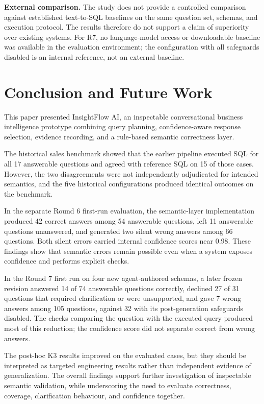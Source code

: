 \documentclass[conference]{IEEEtran}
\begin{document}
\textbf{External comparison.} The study does not provide a controlled comparison against established text-to-SQL baselines on the same question set, schemas, and execution protocol. The results therefore do not support a claim of superiority over existing systems. For R7, no language-model access or downloadable baseline was available in the evaluation environment; the configuration with all safeguards disabled is an internal reference, not an external baseline.

\section{Conclusion and Future Work}

This paper presented InsightFlow AI, an inspectable conversational business intelligence prototype combining query planning, confidence-aware response selection, evidence recording, and a rule-based semantic correctness layer.

The historical sales benchmark showed that the earlier pipeline executed SQL for all 17 answerable questions and agreed with reference SQL on 15 of those cases. However, the two disagreements were not independently adjudicated for intended semantics, and the five historical configurations produced identical outcomes on the benchmark.

In the separate Round 6 first-run evaluation, the semantic-layer implementation produced 42 correct answers among 54 answerable questions, left 11 answerable questions unanswered, and generated two silent wrong answers among 66 questions. Both silent errors carried internal confidence scores near 0.98. These findings show that semantic errors remain possible even when a system exposes confidence and performs explicit checks.

In the Round 7 first run on four new agent-authored schemas, a later frozen revision answered 14 of 74 answerable questions correctly, declined 27 of 31 questions that required clarification or were unsupported, and gave 7 wrong answers among 105 questions, against 32 with its post-generation safeguards disabled. The checks comparing the question with the executed query produced most of this reduction; the confidence score did not separate correct from wrong answers.

The post-hoc K3 results improved on the evaluated cases, but they should be interpreted as targeted engineering results rather than independent evidence of generalization. The overall findings support further investigation of inspectable semantic validation, while underscoring the need to evaluate correctness, coverage, clarification behaviour, and confidence together.
\end{document}
